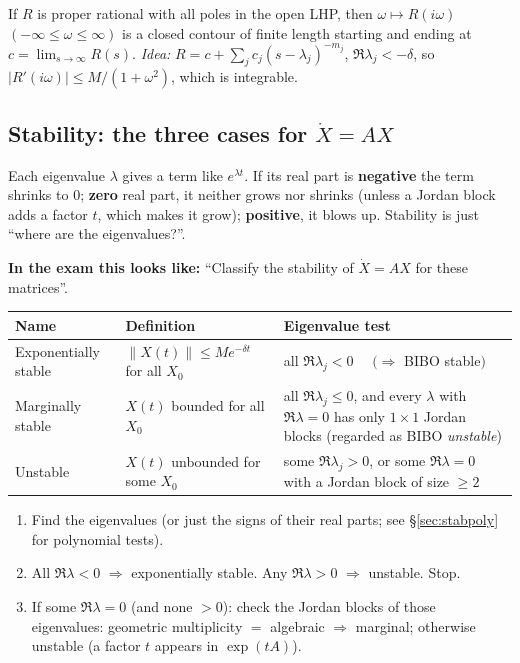 \begin{thmbox}[title={Proposition 0.40 (Nyquist's locus)}]
If $R$ is proper rational with all poles in the open LHP, then $\omega\mapsto R(i\omega)$ $(-\infty\le\omega\le\infty)$ is a closed contour of finite length starting and ending at $c=\lim_{s\to\infty}R(s)$.
\emph{Idea:} $R=c+\sum_jc_j(s-\lambda_j)^{-m_j}$, $\Re\lambda_j<-\delta$, so $|R'(i\omega)|\le M/(1+\omega^2)$, which is integrable.
\end{thmbox}

\subsection{Stability: the three cases for \texorpdfstring{$\dot X=AX$}{dX/dt=AX} \texorpdfstring{}{}}\label{sec:stab}\label{ss:4-3}
\begin{plainbox}
Each eigenvalue $\lambda$ gives a term like $e^{\lambda t}$. If its real part is \textbf{negative} the term shrinks to 0;
\textbf{zero} real part, it neither grows nor shrinks (unless a Jordan block adds a factor $t$, which makes it grow);
\textbf{positive}, it blows up. Stability is just ``where are the eigenvalues?''.
\par\smallskip\textbf{In the exam this looks like:} ``Classify the stability of $\dot X=AX$ for these matrices''.
\end{plainbox}
\begin{thmbox}[title={Stability of $\dot X=AX$, $X(t)=\exp(tA)X_0$}]
\renewcommand{\arraystretch}{1.3}
\begin{tabular}{@{}p{3.1cm}p{5.4cm}p{6.3cm}@{}}
\toprule
\textbf{Name} & \textbf{Definition} & \textbf{Eigenvalue test}\\\midrule
Exponentially stable & $\|X(t)\|\le Me^{-\delta t}$ for all $X_0$ & all $\Re\lambda_j<0$ $\quad(\Rightarrow$ BIBO stable$)$\\
Marginally stable & $X(t)$ bounded for all $X_0$ & all $\Re\lambda_j\le0$, and every $\lambda$ with $\Re\lambda=0$ has only $1\times1$ Jordan blocks (regarded as BIBO \emph{unstable})\\
Unstable & $X(t)$ unbounded for some $X_0$ & some $\Re\lambda_j>0$, or some $\Re\lambda=0$ with a Jordan block of size $\ge2$\\
\bottomrule
\end{tabular}
\end{thmbox}
\begin{methodbox}[title={Method: classify the stability of $\dot X=AX$}]
\begin{enumerate}
\item Find the eigenvalues (or just the signs of their real parts; see \S\ref{sec:stabpoly} for polynomial tests).
\item All $\Re\lambda<0$ $\Rightarrow$ exponentially stable. Any $\Re\lambda>0$ $\Rightarrow$ unstable. Stop.
\item If some $\Re\lambda=0$ (and none $>0$): check the Jordan blocks of those eigenvalues: geometric multiplicity $=$ algebraic $\Rightarrow$ marginal; otherwise unstable (a factor $t$ appears in $\exp(tA)$).
\end{enumerate}
\end{methodbox}
